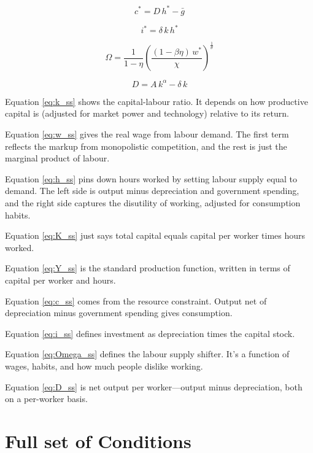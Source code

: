 \documentclass[11pt,preprint]{elsarticle}
\numberwithin{equation}{section}
\numberwithin{figure}{section}
\numberwithin{table}{section}
\begin{document}
\begin{equation}\label{eq:c_ss}
c^* = D\,h^* - \bar{g}
\end{equation}

\begin{equation}\label{eq:i_ss}
i^* = \delta\,k\,h^*
\end{equation}

\begin{equation}\label{eq:Omega_ss}
\Omega = \frac{1}{1-\eta}
         \left(\frac{(1-\beta\eta)\,w^*}{\chi}\right)^{\!\frac{1}{\theta}}
\end{equation}

\begin{equation}\label{eq:D_ss}
D = A\,k^\alpha - \delta\,k
\end{equation}

Equation \eqref{eq:k_ss} shows the capital-labour ratio. It depends on
how productive capital is (adjusted for market power and technology)
relative to its return.

Equation \eqref{eq:w_ss} gives the real wage from labour demand. The
first term reflects the markup from monopolistic competition, and the
rest is just the marginal product of labour.

Equation \eqref{eq:h_ss} pins down hours worked by setting labour supply
equal to demand. The left side is output minus depreciation and
government spending, and the right side captures the disutility of
working, adjusted for consumption habits.

Equation \eqref{eq:K_ss} just says total capital equals capital per
worker times hours worked.

Equation \eqref{eq:Y_ss} is the standard production function, written in
terms of capital per worker and hours.

Equation \eqref{eq:c_ss} comes from the resource constraint. Output net
of depreciation minus government spending gives consumption.

Equation \eqref{eq:i_ss} defines investment as depreciation times the
capital stock.

Equation \eqref{eq:Omega_ss} defines the labour supply shifter. It's a
function of wages, habits, and how much people dislike working.

Equation \eqref{eq:D_ss} is net output per worker---output minus
depreciation, both on a per-worker basis.

\newpage

\section{Full set of Conditions}\label{full-set-of-conditions}
\end{document}
